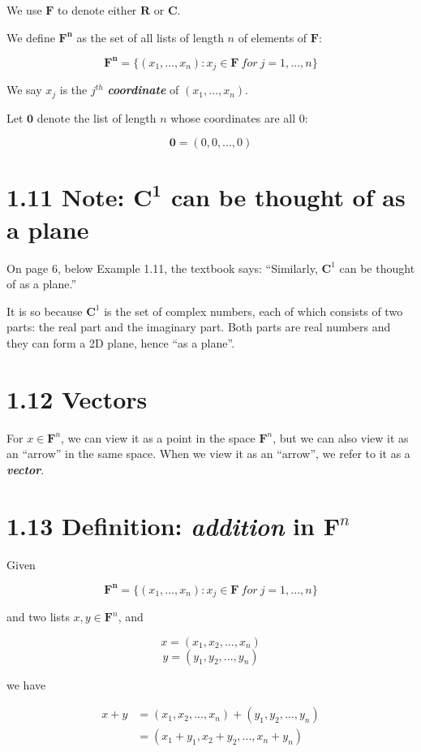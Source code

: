 \documentclass[12pt, letterpaper, oneside]{book}
\begin{document}
We use $\mathbf{F}$ to denote either $\mathbf{R}$ or $\mathbf{C}$.

We define $\mathbf{F^n}$ as the set of all lists of length $n$ of elements of
$\mathbf{F}$:

\[
  \mathbf{F^n} = \{(x_1, ..., x_n): x_j \in \mathbf{F} \ for \ j = 1, ..., n\}
\]

We say $x_j$ is the $j^{th}$ \textbf{\textit{coordinate}} of $(x_1, ..., x_n)$.

Let $\mathbf{0}$ denote the list of length $n$ whose coordinates are all $0$:

\[
  \mathbf{0} = (0, 0, ..., 0)
\]

\section*{1.11 Note: $\mathbf{C^1}$ can be thought of as a plane}

On page 6, below Example 1.11, the textbook says: ``Similarly, $\mathbf{C}^1$
can be thought of as a plane.''

It is so because $\mathbf{C}^1$ is the set of complex numbers, each of which
consists of two parts: the real part and the imaginary part. Both parts are real
numbers and they can form a 2D plane, hence ``as a plane''.

\section*{1.12 Vectors}

For $x \in \mathbf{F}^n$, we can view it as a point in the space $\mathbf{F}^n$,
but we can also view it as an ``arrow'' in the same space. When we view it as
an ``arrow'', we refer to it as a \textbf{\textit{vector}}.

\section*{1.13 Definition: \textit{addition} in $\mathbf{F}^n$}

Given

\[
  \mathbf{F^n} = \{(x_1, ..., x_n): x_j \in \mathbf{F} \ for \ j = 1, ..., n\}
\]

and two lists $x, y \in \mathbf{F}^n$, and

\[
  x = (x_1, x_2, ..., x_n)
\]
\[
  y = (y_1, y_2, ..., y_n)
\]

we have

\begin{equation*}
\begin{split}
  x + y &= (x_1, x_2, ..., x_n) + (y_1, y_2, ..., y_n) \\
        &= (x_1 + y_1, x_2 + y_2, ..., x_n + y_n)
\end{split}
\end{equation*}
\end{document}
